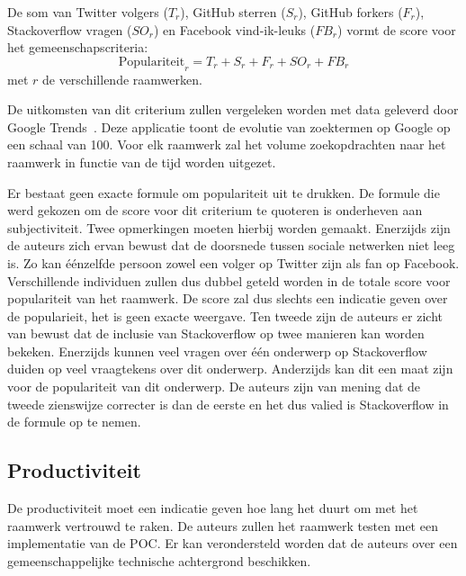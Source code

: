 De som van Twitter volgers ($T_r$), GitHub sterren ($S_r$), GitHub forkers ($F_r$), Stackoverflow vragen ($SO_r$) en Facebook vind-ik-leuks ($FB_r$) vormt de score voor het gemeenschapscriteria:
\begin{equation}
  \text{Populariteit}_r=T_r+S_r+F_r+SO_r+FB_r
  \label{eq:populariteit}
\end{equation}
met $r$ de verschillende raamwerken.

De uitkomsten van dit criterium zullen vergeleken worden met data geleverd door Google Trends~\cite{Google2012a}.
Deze applicatie toont de evolutie van zoektermen op Google op een schaal van 100. %
Voor elk raamwerk zal het volume zoekopdrachten naar het raamwerk in functie van de tijd worden uitgezet.

  Er bestaat geen exacte formule om populariteit uit te drukken.
De formule die werd gekozen om de score voor dit criterium te quoteren is onderheven aan subjectiviteit.
Twee opmerkingen moeten hierbij worden gemaakt.
Enerzijds zijn de auteurs zich ervan bewust dat de doorsnede tussen sociale netwerken niet leeg is.
Zo kan éénzelfde persoon zowel een volger op Twitter zijn als fan op Facebook.
Verschillende individuen zullen dus dubbel geteld worden in de totale score voor populariteit van het raamwerk.
De score zal dus slechts een indicatie geven over de popularieit,  het is geen exacte weergave.
Ten tweede zijn de auteurs er zicht van bewust dat de inclusie van Stackoverflow op twee manieren kan worden bekeken.
Enerzijds kunnen veel vragen over één onderwerp op Stackoverflow duiden op veel vraagtekens over dit onderwerp.
Anderzijds kan dit een maat zijn voor de populariteit van dit onderwerp.
De auteurs zijn van mening dat de tweede zienswijze correcter is dan de eerste en het dus valied is Stackoverflow in de formule op te nemen.


\subsection{Productiviteit}
\label{sec:vergelijking-productiviteit}
De productiviteit moet een indicatie geven hoe lang het duurt om met het raamwerk vertrouwd te raken.
De auteurs zullen het raamwerk testen met een implementatie van de POC.
Er kan verondersteld worden dat de auteurs over een gemeenschappelijke technische achtergrond beschikken.

